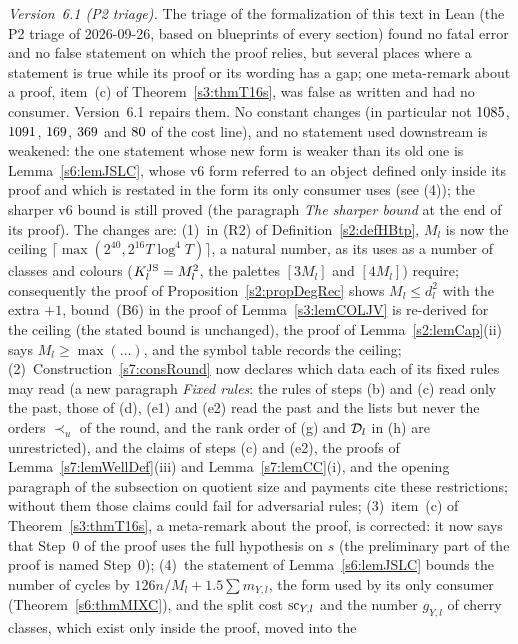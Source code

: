 \begin{remark}
\begin{enumerate}
\emph{Version~6.1 (P2 triage).} The triage of the formalization of this text in
Lean (the P2 triage of 2026-09-26, based on blueprints of every section) found no
fatal error and no false statement on which the proof relies, but several places
where a statement is true while its proof or its wording has a gap; one
meta-remark about a proof, item~(c) of Theorem~\ref{s3:thmT16s}, was false as
written and had no consumer. Version~6.1 repairs them. No constant changes (in
particular not $1085$, $1091$, $169$, $369$ and $80$ of the cost line),
and no statement used downstream is weakened: the one statement whose new form
is weaker than its old one is Lemma~\ref{s6:lemJSLC}, whose v6 form referred to
an object defined only inside its proof and which is restated in the form its
only consumer uses (see (4)); the sharper v6 bound is still proved (the paragraph
\emph{The sharper bound} at the end of its proof). The changes are:
(1)~in (R2) of Definition~\ref{s2:defHBtp}, $M_l$ is now the ceiling
$\lceil\max(2^{40},2^{16}T\log^4T)\rceil$, a natural number, as its uses as a
number of classes and colours ($K^{\mathrm{JS}}_l=M_l^2$, the palettes $[3M_l]$ and
$[4M_l]$) require; consequently the proof of Proposition~\ref{s2:propDegRec}
shows $M_l\le d_l^2$ with the extra $+1$, bound~(B6) in the proof of
Lemma~\ref{s3:lemCOLJV} is re-derived for the ceiling (the stated bound is
unchanged), the proof of Lemma~\ref{s2:lemCap}(ii) says $M_l\ge\max(\dots)$, and
the symbol table records the ceiling;
(2)~Construction~\ref{s7:consRound} now declares which data each of its fixed
rules may read (a new paragraph \emph{Fixed rules}: the rules of steps (b) and
(c) read only the past, those of (d), (e1) and (e2) read the past and the lists
but never the orders $\prec_u$ of the round, and the rank order of (g) and
$\mathcal{D}_l$ in (h) are unrestricted), and the claims of steps (c) and (e2), the
proofs of Lemma~\ref{s7:lemWellDef}(iii) and Lemma~\ref{s7:lemCC}(i), and the
opening paragraph of the subsection on quotient size and payments cite these
restrictions; without them those claims could fail for adversarial rules;
(3)~item~(c) of Theorem~\ref{s3:thmT16s}, a meta-remark about the proof, is
corrected: it now says that Step~0 of the proof uses the full hypothesis on $s$
(the preliminary part of the proof is named Step~0);
(4)~the statement of Lemma~\ref{s6:lemJSLC} bounds the number of cycles by
$126n/M_l+1.5\sum m_{Y,l}$, the form used by its only consumer
(Theorem~\ref{s6:thmMIXC}), and the split cost $\mathrm{sc}_{Y,l}$ and the number
$g_{Y,l}$ of cherry classes, which exist only inside the proof, moved into the

\end{enumerate}
\end{remark}
